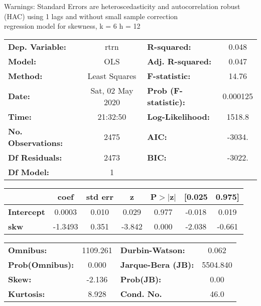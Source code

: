 Warnings: \newline
 [1] Standard Errors are heteroscedasticity and autocorrelation robust (HAC) using 1 lags and without small sample correction\\ 

regression model for skewness, k = 6 h = 12\begin{center}
\begin{tabular}{lclc}
\toprule
\textbf{Dep. Variable:}    &       rtrn       & \textbf{  R-squared:         } &     0.048   \\
\textbf{Model:}            &       OLS        & \textbf{  Adj. R-squared:    } &     0.047   \\
\textbf{Method:}           &  Least Squares   & \textbf{  F-statistic:       } &     14.76   \\
\textbf{Date:}             & Sat, 02 May 2020 & \textbf{  Prob (F-statistic):} &  0.000125   \\
\textbf{Time:}             &     21:32:50     & \textbf{  Log-Likelihood:    } &    1518.8   \\
\textbf{No. Observations:} &        2475      & \textbf{  AIC:               } &    -3034.   \\
\textbf{Df Residuals:}     &        2473      & \textbf{  BIC:               } &    -3022.   \\
\textbf{Df Model:}         &           1      & \textbf{                     } &             \\
\bottomrule
\end{tabular}
\begin{tabular}{lcccccc}
                   & \textbf{coef} & \textbf{std err} & \textbf{z} & \textbf{P$> |$z$|$} & \textbf{[0.025} & \textbf{0.975]}  \\
\midrule
\textbf{Intercept} &       0.0003  &        0.010     &     0.029  &         0.977        &       -0.018    &        0.019     \\
\textbf{skw}       &      -1.3493  &        0.351     &    -3.842  &         0.000        &       -2.038    &       -0.661     \\
\bottomrule
\end{tabular}
\begin{tabular}{lclc}
\textbf{Omnibus:}       & 1109.261 & \textbf{  Durbin-Watson:     } &    0.062  \\
\textbf{Prob(Omnibus):} &   0.000  & \textbf{  Jarque-Bera (JB):  } & 5504.840  \\
\textbf{Skew:}          &  -2.136  & \textbf{  Prob(JB):          } &     0.00  \\
\textbf{Kurtosis:}      &   8.928  & \textbf{  Cond. No.          } &     46.0  \\
\bottomrule
\end{tabular}
\end{center}

